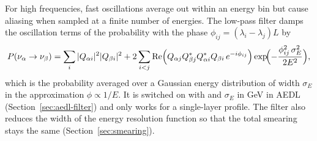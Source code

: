 For high frequencies, fast oscillations average out within an energy bin but
cause aliasing when sampled at a finite number of energies. The low-pass filter
damps the oscillation terms of the probability with the phase
$\phi_{ij}=(\lambda_i-\lambda_j)L$ by
\begin{equation}
P(\nu_\alpha\to\nu_\beta) = \sum_i |Q_{\alpha i}|^2|Q_{\beta i}|^2
 + 2\sum_{i<j}\mathrm{Re}\Bigl(Q_{\alpha j}Q_{\beta j}^*Q_{\alpha i}^*Q_{\beta i}\,e^{-i\phi_{ij}}\Bigr)
   \exp\!\Bigl(-\frac{\phi_{ij}^2\,\sigma_E^2}{2E^2}\Bigr),
\end{equation}
which is the probability averaged over a Gaussian energy distribution of width
$\sigma_E$ in the approximation $\phi\propto1/E$. It is switched on with
 and $\sigma_E$ in GeV in AEDL
(Section~\ref{sec:aedl-filter}) and only works for a single-layer profile. The
filter also reduces the width of the energy resolution function so that the
total smearing stays the same (Section~\ref{sec:smearing}).

